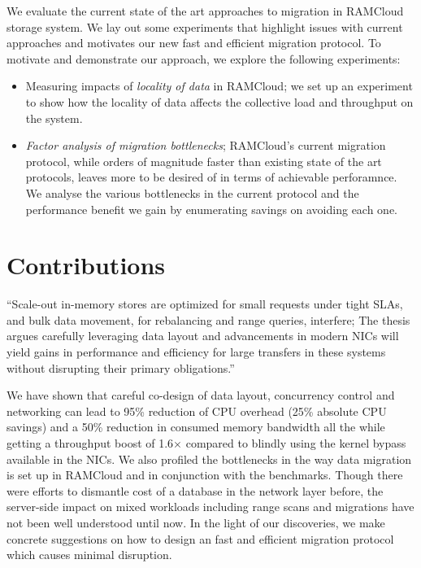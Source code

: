 We evaluate the current state of the art approaches to migration in RAMCloud storage system.
We lay out some experiments that highlight issues with current approaches and motivates our new 
fast and efficient migration protocol. To motivate and demonstrate our approach, we explore
the following experiments:
\begin{itemize}
\item Measuring impacts of {\em locality of data} in RAMCloud; we set up an experiment to show how 
the locality of data affects the collective load and throughput on the system.
\item {\em Factor analysis of migration bottlenecks}; RAMCloud's current migration protocol, while orders 
of magnitude faster than existing state of the art protocols, leaves more to be desired of in terms of achievable perforamnce.
We analyse the various bottlenecks in the current protocol and the performance benefit we gain by enumerating savings on avoiding 
each one.
\end{itemize} 

\section{Contributions}
\label{sec:contributions}
``Scale-out in-memory stores are optimized for small requests
under tight SLAs, and bulk data movement, for rebalancing and range queries, interfere;
The thesis argues \linebreak carefully leveraging data layout and advancements in modern NICs
will yield gains in performance and efficiency for large transfers in these systems
without disrupting their primary obligations.''
 
We have shown that careful co-design of data layout, concurrency control
and \linebreak networking can lead to 95\% reduction of CPU overhead (25\% absolute CPU savings) and a 
50\% reduction in consumed memory bandwidth all the while getting a throughput
boost of 1.6$\times$ compared to blindly using the kernel bypass available
in the NICs. We also profiled the bottlenecks in the way data migration is set up
in RAMCloud and in conjunction with the benchmarks. Though there were efforts to 
dismantle cost of a database in the network layer before, the server-side impact
on mixed workloads including range scans and migrations have not been well understood
until now. In the light of our discoveries, we make concrete suggestions on how
 to design an fast and efficient migration protocol which causes minimal disruption.

